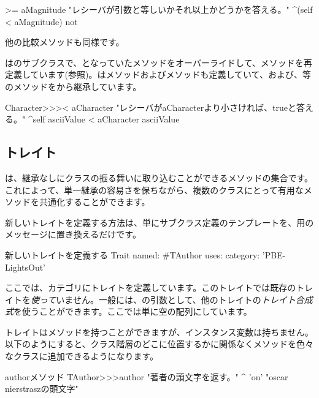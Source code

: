 \documentclass[a4paper,10pt,twoside]{book}
\begin{document}
\begin{method}[Magnitude>=]{}
>= aMagnitude 
	"レシーバが引数と等しいかそれ以上かどうかを答える。"
	^(self < aMagnitude) not
\end{method}
他の比較メソッドも同様です。

はのサブクラスで、となっていた\ct{<}メソッドをオーバーライドして、メソッドを再定義しています(参照)。は\ct{=}メソッドおよびメソッドも定義していて、\ct{>=}および\ct{<=}、\ct{~=}等のメソッドをから継承しています。

\begin{method}[CharacterLessThan]{}
Character>>>< aCharacter 
	"レシーバがaCharacterより小さければ、trueと答える。"
	^self asciiValue < aCharacter asciiValue
\end{method}

\subsection{トレイト}
は、継承なしにクラスの振る舞いに取り込むことができるメソッドの集合です。これによって、単一継承の容易さを保ちながら、複数のクラスにとって有用なメソッドを共通化することができます。

新しいトレイトを定義する方法は、単にサブクラス定義のテンプレートを、用のメッセージに置き換えるだけです。

\begin{classdef}[tauthor]{新しいトレイトを定義する}
Trait named: #TAuthor
	uses: { }
	category: 'PBE-LightsOut'
\end{classdef}

\noindent
ここでは、カテゴリにトレイトを定義しています。このトレイトでは既存のトレイトを\emph{使って}いません。一般には、の引数として、他のトレイトの\emph{トレイト合成式}を使うことができます。ここでは単に空の配列にしています。

トレイトはメソッドを持つことができますが、インスタンス変数は持ちません。以下のようにすると、クラス階層のどこに位置するかに関係なくメソッドを色々なクラスに追加できるようになります。

\begin{method}[author]{authorメソッド}
TAuthor>>>author
    "著者の頭文字を返す。"
	^ 'on'    "oscar nierstraszの頭文字"
\end{method}
\end{document}
